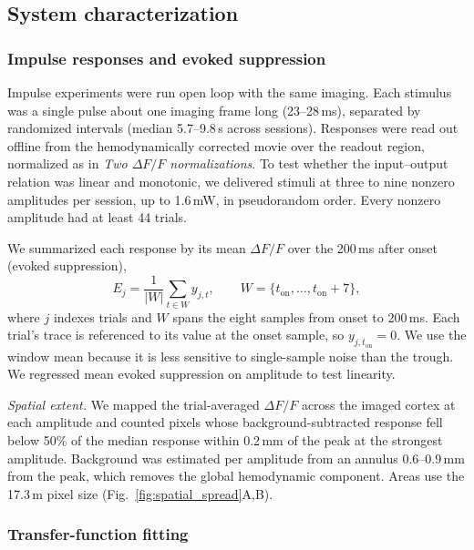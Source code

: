 \subsection*{System characterization}

\subsubsection*{Impulse responses and evoked suppression}
\label{sec:inhib_energy}

Impulse experiments were run open loop with the same imaging. Each stimulus was
a single pulse about one imaging frame long (23--28\,ms), separated by
randomized intervals (median 5.7--9.8\,s across sessions). Responses were read
out offline from the hemodynamically corrected movie over the readout region,
normalized as in \emph{Two $\Delta F/F$ normalizations}. To test whether the
input--output relation was linear and monotonic, we delivered stimuli at three
to nine nonzero amplitudes per session, up to 1.6\,mW, in pseudorandom order.
Every nonzero amplitude had at least 44 trials.

We summarized each response by its mean $\Delta F/F$ over the 200\,ms after
onset (evoked suppression),
%
\begin{equation}
    E_{j} = \frac{1}{\lvert W \rvert}\sum_{t \in W} y_{j,t},
    \qquad W = \{t_{\mathrm{on}},\ldots,t_{\mathrm{on}}+7\},
    \label{eq:inhib_energy}
\end{equation}
%
where $j$ indexes trials and $W$ spans the eight samples from onset to 200\,ms.
Each trial's trace is referenced to its value at the onset sample, so
$y_{j,t_{\mathrm{on}}} = 0$. We use the window mean because it is less
sensitive to single-sample noise than the trough. We regressed mean evoked
suppression on amplitude to test linearity.

\emph{Spatial extent.} We mapped the trial-averaged $\Delta F/F$ across the
imaged cortex at each amplitude and counted pixels whose background-subtracted
response fell below 50\% of the median response within 0.2\,mm of the peak at
the strongest amplitude. Background was estimated per amplitude from an annulus
0.6--0.9\,mm from the peak, which removes the global hemodynamic component.
Areas use the 17.3\,\textmu m pixel size (Fig.~\ref{fig:spatial_spread}A,B).

\subsubsection*{Transfer-function fitting}
\label{sec:tf_fitting}

